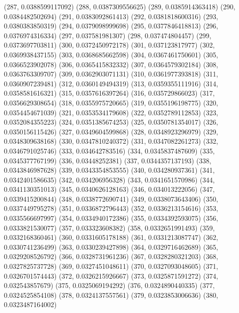 {					(287, 0.0388599117092)
					(288, 0.0387309556625)
					(289, 0.0385914363418)
					(290, 0.0384482502694)
					(291, 0.0383092861413)
					(292, 0.0381818600316)
					(293, 0.0380383850319)
					(294, 0.0379098999698)
					(295, 0.0377846418813)
					(296, 0.0376974316334)
					(297, 0.037581981307)
					(298, 0.037474804457)
					(299, 0.0373697703811)
					(300, 0.0372450972178)
					(301, 0.037123817977)
					(302, 0.0369938437155)
					(303, 0.0368685662598)
					(304, 0.0367461750601)
					(305, 0.0366523902078)
					(306, 0.0365415832332)
					(307, 0.0364579302184)
					(308, 0.0363763309707)
					(309, 0.0362903071131)
					(310, 0.0361977393818)
					(311, 0.0360907239481)
					(312, 0.0360149494319)
					(313, 0.0359355111916)
					(314, 0.0358581616321)
					(315, 0.0357616397264)
					(316, 0.035729866023)
					(317, 0.0356629308654)
					(318, 0.0355975720665)
					(319, 0.0355196198775)
					(320, 0.0354454671039)
					(321, 0.0353534179608)
					(322, 0.0352789112853)
					(323, 0.0352084355223)
					(324, 0.0351385674253)
					(325, 0.0350781354017)
					(326, 0.0350156115426)
					(327, 0.0349604599868)
					(328, 0.0348923296979)
					(329, 0.0348309638168)
					(330, 0.0347810240372)
					(331, 0.0347082261273)
					(332, 0.0346791025746)
					(333, 0.034642783516)
					(334, 0.0345837487609)
					(335, 0.0345377767199)
					(336, 0.03448252381)
					(337, 0.0344357137193)
					(338, 0.0343846987628)
					(339, 0.0343354853555)
					(340, 0.034280937361)
					(341, 0.0342401586635)
					(342, 0.034206956328)
					(343, 0.0341651570986)
					(344, 0.0341130351013)
					(345, 0.0340626128163)
					(346, 0.034013222056)
					(347, 0.0339415200844)
					(348, 0.0338772690741)
					(349, 0.0338073643406)
					(350, 0.0337449795278)
					(351, 0.0336872796443)
					(352, 0.0336213154616)
					(353, 0.0335566697997)
					(354, 0.0334940172386)
					(355, 0.0334392593075)
					(356, 0.0333821530077)
					(357, 0.033323608382)
					(358, 0.0332651991493)
					(359, 0.0332168360461)
					(360, 0.0331605178188)
					(361, 0.0331213087747)
					(362, 0.0330741236499)
					(363, 0.0330239427898)
					(364, 0.0329716462689)
					(365, 0.0329208526792)
					(366, 0.0328731961236)
					(367, 0.0328280321203)
					(368, 0.0327825737728)
					(369, 0.0327451048611)
					(370, 0.0327093048605)
					(371, 0.0326701574443)
					(372, 0.0326215926667)
					(373, 0.0325871591272)
					(374, 0.032543857679)
					(375, 0.0325069194292)
					(376, 0.0324890440335)
					(377, 0.0324525854108)
					(378, 0.0324137557561)
					(379, 0.0323853006636)
					(380, 0.0323487164002)
}
